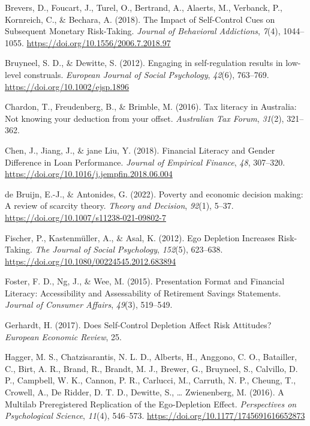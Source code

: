 \documentclass[
  letterpaper,
  DIV=11,
  numbers=noendperiod]{scrartcl}
\newlength{\cslhangindent}
\newlength{\cslentryspacingunit} %
\newenvironment{CSLReferences}[2] %
 {%
  \setlength{\parindent}{0pt}
  \ifodd #1
  \let\oldpar\par
  \def\par{\hangindent=\cslhangindent\oldpar}
  \fi
  \setlength{\parskip}{#2\cslentryspacingunit}
 }%
 {}
\begin{document}
\begin{CSLReferences}{1}{0}
\leavevmode{}%
Brevers, D., Foucart, J., Turel, O., Bertrand, A., Alaerts, M.,
Verbanck, P., Kornreich, C., \& Bechara, A. (2018). The {Impact} of
{Self-Control Cues} on {Subsequent Monetary Risk-Taking}. \emph{Journal
of Behavioral Addictions}, \emph{7}(4), 1044--1055.
\url{https://doi.org/10.1556/2006.7.2018.97}

\leavevmode{}%
Bruyneel, S. D., \& Dewitte, S. (2012). Engaging in self-regulation
results in low-level construals. \emph{European Journal of Social
Psychology}, \emph{42}(6), 763--769.
\url{https://doi.org/10.1002/ejsp.1896}

\leavevmode{}%
Chardon, T., Freudenberg, B., \& Brimble, M. (2016). Tax literacy in
{Australia}: Not knowing your deduction from your offset.
\emph{Australian Tax Forum}, \emph{31}(2), 321--362.

\leavevmode{}%
Chen, J., Jiang, J., \& jane Liu, Y. (2018). Financial {Literacy} and
{Gender Difference} in {Loan Performance}. \emph{Journal of Empirical
Finance}, \emph{48}, 307--320.
\url{https://doi.org/10.1016/j.jempfin.2018.06.004}

\leavevmode{}%
de Bruijn, E.-J., \& Antonides, G. (2022). Poverty and economic decision
making: A review of scarcity theory. \emph{Theory and Decision},
\emph{92}(1), 5--37. \url{https://doi.org/10.1007/s11238-021-09802-7}

\leavevmode{}%
Fischer, P., Kastenmüller, A., \& Asal, K. (2012). Ego {Depletion
Increases Risk-Taking}. \emph{The Journal of Social Psychology},
\emph{152}(5), 623--638.
\url{https://doi.org/10.1080/00224545.2012.683894}

\leavevmode{}%
Foster, F. D., Ng, J., \& Wee, M. (2015). Presentation {Format} and
{Financial Literacy}: {Accessibility} and {Assessability} of {Retirement
Savings Statements}. \emph{Journal of Consumer Affairs}, \emph{49}(3),
519--549.

\leavevmode{}%
Gerhardt, H. (2017). Does {Self-Control Depletion Affect Risk
Attitudes}? \emph{European Economic Review}, 25.

\leavevmode{}%
Hagger, M. S., Chatzisarantis, N. L. D., Alberts, H., Anggono, C. O.,
Batailler, C., Birt, A. R., Brand, R., Brandt, M. J., Brewer, G.,
Bruyneel, S., Calvillo, D. P., Campbell, W. K., Cannon, P. R., Carlucci,
M., Carruth, N. P., Cheung, T., Crowell, A., De Ridder, D. T. D.,
Dewitte, S., \ldots{} Zwienenberg, M. (2016). A {Multilab Preregistered
Replication} of the {Ego-Depletion Effect}. \emph{Perspectives on
Psychological Science}, \emph{11}(4), 546--573.
\url{https://doi.org/10.1177/1745691616652873}


\end{CSLReferences}
\end{document}
